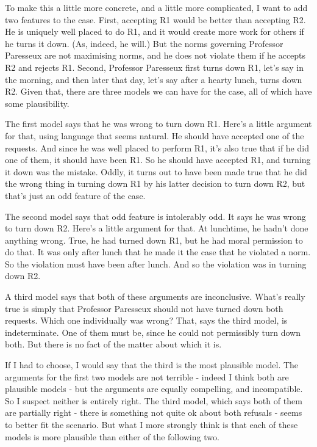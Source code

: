 \documentclass[
  11pt,
]{book}
\begin{document}
To make this a little more concrete, and a little more complicated, I want to add two features to the case. First, accepting R1 would be better than accepting R2. He is uniquely well placed to do R1, and it would create more work for others if he turns it down. (As, indeed, he will.) But the norms governing Professor Paresseux are not maximising norms, and he does not violate them if he accepts R2 and rejects R1. Second, Professor Paresseux first turns down R1, let's say in the morning, and then later that day, let's say after a hearty lunch, turns down R2. Given that, there are three models we can have for the case, all of which have some plausibility.

The first model says that he was wrong to turn down R1. Here's a little argument for that, using language that seems natural. He should have accepted one of the requests. And since he was well placed to perform R1, it's also true that if he did one of them, it should have been R1. So he should have accepted R1, and turning it down was the mistake. Oddly, it turns out to have been made true that he did the wrong thing in turning down R1 by his latter decision to turn down R2, but that's just an odd feature of the case.

The second model says that odd feature is intolerably odd. It says he was wrong to turn down R2. Here's a little argument for that. At lunchtime, he hadn't done anything wrong. True, he had turned down R1, but he had moral permission to do that. It was only after lunch that he made it the case that he violated a norm. So the violation must have been after lunch. And so the violation was in turning down R2.

A third model says that both of these arguments are inconclusive. What's really true is simply that Professor Paresseux should not have turned down both requests. Which one individually was wrong? That, says the third model, is indeterminate. One of them must be, since he could not permissibly turn down both. But there is no fact of the matter about which it is.

If I had to choose, I would say that the third is the most plausible model. The arguments for the first two models are not terrible - indeed I think both are plausible models - but the arguments are equally compelling, and incompatible. So I suspect neither is entirely right. The third model, which says both of them are partially right - there is something not quite ok about both refusals - seems to better fit the scenario. But what I more strongly think is that each of these models is more plausible than either of the following two.
\end{document}
